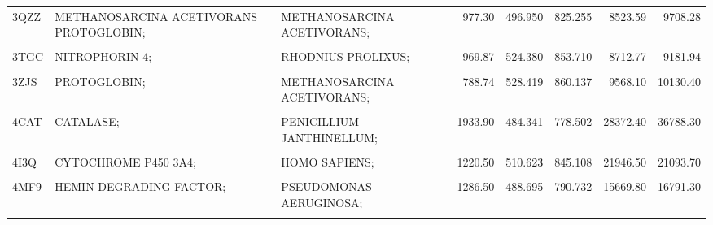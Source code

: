\begin{table}
{\begin{tabular}{lllrrrrr}
				3QZZ & METHANOSARCINA ACETIVORANS PROTOGLOBIN; & METHANOSARCINA ACETIVORANS; & 977.30 & 496.950 & 825.255 & 8523.59 & 9708.28\\
				\cellcolor{gray!6}{3SIK} & \cellcolor{gray!6}{CONSERVED DOMAIN PROTEIN;} & \cellcolor{gray!6}{BACILLUS ANTHRACIS;} & \cellcolor{gray!6}{492.15} & \cellcolor{gray!6}{498.621} & \cellcolor{gray!6}{823.565} & \cellcolor{gray!6}{6495.38} & \cellcolor{gray!6}{7739.06}\\
				\addlinespace
				3TGC & NITROPHORIN-4; & RHODNIUS PROLIXUS; & 969.87 & 524.380 & 853.710 & 8712.77 & 9181.94\\
				\cellcolor{gray!6}{3VP5} & \cellcolor{gray!6}{TRANSCRIPTIONAL REGULATOR;} & \cellcolor{gray!6}{LACTOCOCCUS LACTIS;} & \cellcolor{gray!6}{1094.60} & \cellcolor{gray!6}{602.790} & \cellcolor{gray!6}{1050.820} & \cellcolor{gray!6}{9801.82} & \cellcolor{gray!6}{10810.80}\\
				3ZJS & PROTOGLOBIN; & METHANOSARCINA ACETIVORANS; & 788.74 & 528.419 & 860.137 & 9568.10 & 10130.40\\
				\cellcolor{gray!6}{4B8N} & \cellcolor{gray!6}{CYTOCHROME B5-HOST ORIGIN;} & \cellcolor{gray!6}{OSTREOCOCCUS TAURI VIRUS 2;} & \cellcolor{gray!6}{841.27} & \cellcolor{gray!6}{569.302} & \cellcolor{gray!6}{990.216} & \cellcolor{gray!6}{4560.39} & \cellcolor{gray!6}{5458.66}\\
				4CAT & CATALASE; & PENICILLIUM JANTHINELLUM; & 1933.90 & 484.341 & 778.502 & 28372.40 & 36788.30\\
				\addlinespace
				\cellcolor{gray!6}{4CDP} & \cellcolor{gray!6}{PUTATIVE HEME/HEMOGLOBIN TRANSPORT PROTEIN;} & \cellcolor{gray!6}{ESCHERICHIA COLI;} & \cellcolor{gray!6}{1053.70} & \cellcolor{gray!6}{1425.050} & \cellcolor{gray!6}{3141.090} & \cellcolor{gray!6}{14733.50} & \cellcolor{gray!6}{15887.40}\\
				4I3Q & CYTOCHROME P450 3A4; & HOMO SAPIENS; & 1220.50 & 510.623 & 845.108 & 21946.50 & 21093.70\\
				\cellcolor{gray!6}{4JET} & \cellcolor{gray!6}{HEMOPHORE HASA;} & \cellcolor{gray!6}{YERSINIA PESTIS;} & \cellcolor{gray!6}{1010.80} & \cellcolor{gray!6}{495.992} & \cellcolor{gray!6}{818.131} & \cellcolor{gray!6}{7887.81} & \cellcolor{gray!6}{8695.85}\\
				4MF9 & HEMIN DEGRADING FACTOR; & PSEUDOMONAS AERUGINOSA; & 1286.50 & 488.695 & 790.732 & 15669.80 & 16791.30\\
				\cellcolor{gray!6}{4MYP} & \cellcolor{gray!6}{IRON-REGULATED SURFACE DETERMINANT PROTEIN A;} & \cellcolor{gray!6}{LISTERIA MONOCYTOGENES;} & \cellcolor{gray!6}{610.72} & \cellcolor{gray!6}{963.019} & \cellcolor{gray!6}{1834.680} & \cellcolor{gray!6}{6285.40} & \cellcolor{gray!6}{7351.53}\\

\end{tabular}}
\end{table}

